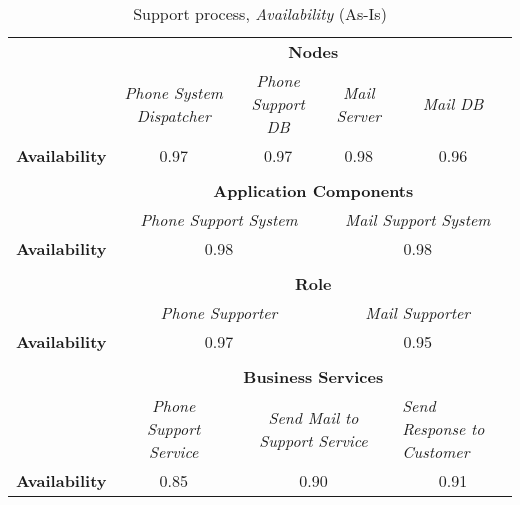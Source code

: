 \begin{table}[H]
	\centering
	\begin{tabular}{|c|c|p{2.5cm}|p{2.5cm}|p{2.5cm}|p{2.5cm}|}

		\cline{3-6}

		\multicolumn{2}{c}{} & \multicolumn{4}{|c|}{\textbf{Nodes}} \\ \cline{3-6}
		\multicolumn{2}{c|}{} & \multicolumn{1}{|c|}{\textsl{Phone System Dispatcher}} & \multicolumn{1}{|c|}{\textsl{Phone Support DB}} & \multicolumn{1}{|c|}{\textsl{Mail Server}} &\multicolumn{1}{|c|}{\textsl{Mail DB}} \\ \hline
		\multicolumn{2}{|c|}{\textbf{Availability}} & \multicolumn{1}{|c|}{0.97} & \multicolumn{1}{|c|}{0.97} & \multicolumn{1}{|c|}{0.98} & \multicolumn{1}{|c|}{0.96} \\  \hline

		\multicolumn{6}{c}{} \\ \cline{3-6}							
		\multicolumn{2}{c}{} & \multicolumn{4}{|c|}{\textbf{Application Components}} \\ \cline{3-6}
		\multicolumn{2}{c|}{} & \multicolumn{2}{c|}{\textsl{Phone Support System}} & \multicolumn{2}{c|}{\textsl{Mail Support System}} \\
		\hline
		\multicolumn{2}{|c|}{\textbf{Availability}} & \multicolumn{2}{c|}{0.98} & \multicolumn{2}{c|}{0.98} \\ \hline

	   \multicolumn{6}{c}{} \\ \cline{3-6}
		\multicolumn{2}{c}{} & \multicolumn{4}{|c|}{\textbf{Role}} \\ \cline{3-6}
		\multicolumn{2}{c|}{} & \multicolumn{2}{|c|}{\textsl{Phone Supporter}} & \multicolumn{2}{|c|}{\textsl{Mail Supporter}}\\ \hline
		\multicolumn{2}{|c|}{\textbf{Availability}}& \multicolumn{2}{|c|}{0.97} & \multicolumn{2}{|c|}{0.95}\\  \hline
		
		\multicolumn{6}{c}{} \\ \cline{3-6}
		\multicolumn{2}{c}{} & \multicolumn{4}{|c|}{\textbf{Business Services}} \\ \cline{3-6}
		\multicolumn{2}{c|}{} & \multicolumn{1}{|c|}{\textsl{Phone Support Service}} & \multicolumn{2}{|c|}{\textsl{Send Mail to Support Service}} & \multicolumn{1}{|p{2cm}|}{\textsl{Send Response to Customer}}\\ \hline
		\multicolumn{2}{|c|}{\textbf{Availability}}& \multicolumn{1}{|c|}{0.85} & \multicolumn{2}{|c|}{0.90} & \multicolumn{1}{|c|}{0.91}\\ \hline
	\end{tabular}
\caption{Support process, \textsl{Availability} (As-Is)} 
\label{tab:support_as_is}
\end{table}